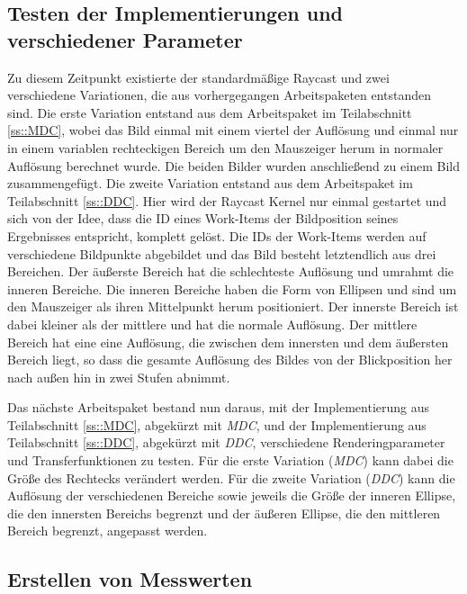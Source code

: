 \subsection{Testen der Implementierungen und verschiedener Parameter}
Zu diesem Zeitpunkt existierte der standardmäßige Raycast und zwei verschiedene Variationen, die aus vorhergegangen Arbeitspaketen entstanden sind.
Die erste Variation entstand aus dem Arbeitspaket im Teilabschnitt \ref{ss::MDC}, wobei das Bild einmal mit einem viertel der Auflösung und einmal nur in einem variablen rechteckigen Bereich um den Mauszeiger herum in normaler Auflösung berechnet wurde.
Die beiden Bilder wurden anschließend zu einem Bild zusammengefügt.
Die zweite Variation entstand aus dem Arbeitspaket im Teilabschnitt \ref{ss::DDC}.
Hier wird der Raycast Kernel nur einmal gestartet und sich von der Idee, dass die ID eines Work-Items der Bildposition seines Ergebnisses entspricht, komplett gelöst.
Die IDs der Work-Items werden auf verschiedene Bildpunkte abgebildet und das Bild besteht letztendlich aus drei Bereichen.
Der äußerste Bereich hat die schlechteste Auflösung und umrahmt die inneren Bereiche.
Die inneren Bereiche haben die Form von Ellipsen und sind um den Mauszeiger als ihren Mittelpunkt herum positioniert.
Der innerste Bereich ist dabei kleiner als der mittlere und hat die normale Auflösung.
Der mittlere Bereich hat eine eine Auflösung, die zwischen dem innersten und dem äußersten Bereich liegt, so dass die gesamte Auflösung des Bildes von der Blickposition her nach außen hin in zwei Stufen abnimmt.

Das nächste Arbeitspaket bestand nun daraus, mit der Implementierung aus Teilabschnitt \ref{ss::MDC}, abgekürzt mit \emph{MDC}, und der Implementierung aus Teilabschnitt \ref{ss::DDC}, abgekürzt mit \emph{DDC}, verschiedene Renderingparameter und Transferfunktionen zu testen.
Für die erste Variation (\emph{MDC}) kann dabei die Größe des Rechtecks verändert werden.
Für die zweite Variation (\emph{DDC}) kann die Auflösung der verschiedenen Bereiche sowie jeweils die Größe der inneren Ellipse, die den innersten Bereichs begrenzt und der äußeren Ellipse, die den mittleren Bereich begrenzt, angepasst werden.


\subsection{Erstellen von Messwerten}

